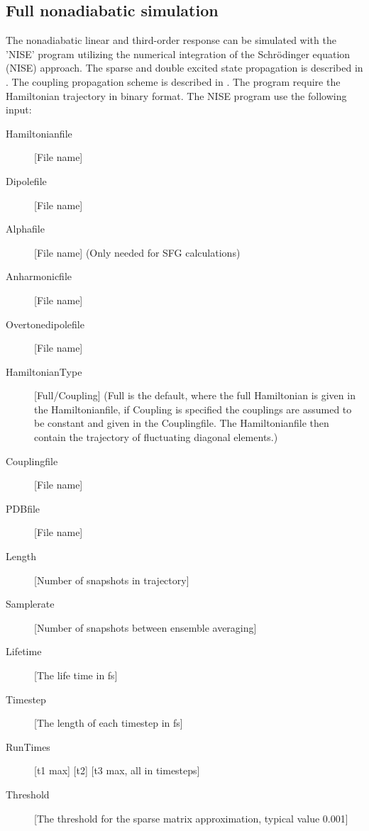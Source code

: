 \subsection{Full nonadiabatic simulation}
The nonadiabatic linear and third-order response can be simulated with the 'NISE' program utilizing the numerical integration of the Schr\"odinger equation (NISE) approach\cite{Jansen.2006.JPCB.110.22910,Jansen.2009.ACR.42.1405}. The sparse and double excited state propagation is described in \cite{Jansen.2010.JCP.132.224503}.
The coupling propagation scheme is described in \cite{Liang.2012.JCTC.8.1706}.
The program require the Hamiltonian trajectory in binary format.
The NISE program use the following input:\\
\begin{description}
\item [Hamiltonianfile] [File name]
\item [Dipolefile] [File name]
\item [Alphafile] [File name] (Only needed for SFG calculations)
\item [Anharmonicfile] [File name]
\item [Overtonedipolefile] [File name]
\item [HamiltonianType] [Full/Coupling] (Full is the default, where the full Hamiltonian is given in the Hamiltonianfile, if Coupling is specified the couplings are assumed to be constant and given in the Couplingfile. The Hamiltonianfile then contain the trajectory of fluctuating diagonal elements.)
\item [Couplingfile] [File name]
\item [PDBfile] [File name]
\item [Length] [Number of snapshots in trajectory] 
\item [Samplerate] [Number of snapshots between ensemble averaging]
\item [Lifetime] [The life time in fs]
\item [Timestep] [The length of each timestep in fs]
\item [RunTimes] [t1 max] [t2] [t3 max, all in timesteps]
\item [Threshold][The threshold for the sparse matrix approximation, typical value 0.001]

\end{description}

